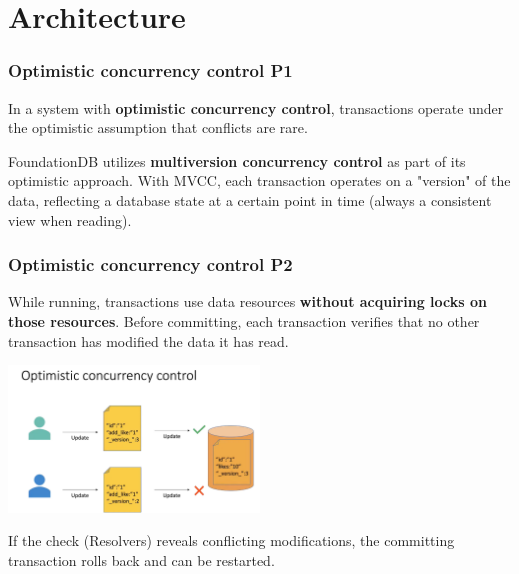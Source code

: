 \section{Architecture}

\begin{frame}
	\frametitle{Optimistic concurrency control P1}
 In a system with \textbf{optimistic concurrency control}, transactions operate under the optimistic assumption that conflicts are rare. 
\vspace{0.5cm}

FoundationDB utilizes \textbf{multiversion concurrency control} as part of its optimistic approach. With MVCC, each transaction operates on a "version" of the data, reflecting a database state at a certain point in time (always a consistent view when reading).
\end{frame}

\begin{frame}
	\frametitle{Optimistic concurrency control P2}
While running, transactions use data resources \textbf{without acquiring locks on those resources}. Before committing, each transaction verifies that no other transaction has modified the data it has read. 
\vspace{0.2cm}

\begin{center}
    \includegraphics[width=0.5\textwidth]{img/2-Architecture/Optimistic Concurrency Control.png}
\end{center}

If the check (Resolvers) reveals conflicting modifications, the committing transaction rolls back and can be restarted.


\end{frame}




